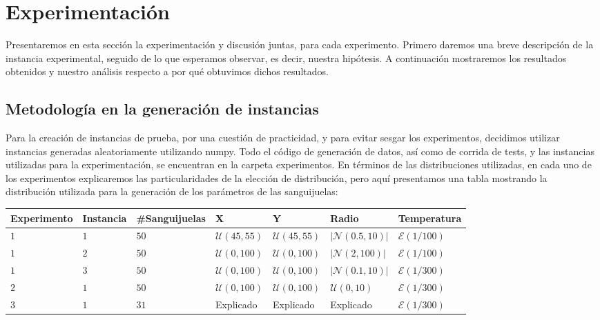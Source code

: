 \section{Experimentación}

Presentaremos en esta sección la experimentación y discusión juntas, para cada experimento. Primero daremos una breve descripción de la instancia experimental, seguido de lo que esperamos observar, es decir, nuestra hipótesis. A continuación mostraremos los 
resultados obtenidos y nuestro análisis respecto a por qué obtuvimos dichos resultados.

\subsection{Metodología en la generación de instancias}

Para la creación de instancias de prueba, por una cuestión de practicidad, y para evitar sesgar los experimentos, decidimos utilizar instancias generadas aleatoriamente utilizando numpy. Todo el código de generación de datos, así como de corrida de tests, y las instancias utilizadas para la experimentación, se encuentran en la carpeta experimentos. En términos de las distribuciones utilizadas, en cada uno de los experimentos explicaremos las particularidades de la elección de distribución, pero aquí presentamos una tabla mostrando la distribución utilizada para la generación de los parámetros de las sanguijuelas:

\begin{center}
\begin{tabular}{l | l | l | l | l | l | l}
Experimento & Instancia & \#Sanguijuelas & X & Y & Radio & Temperatura\\ \hline
$1$ & $1$ & $50$ & $\mathcal{U}(45, 55)$ & $\mathcal{U}(45, 55)$ & $|\mathcal{N}(0.5, 10)|$ & $\mathcal{E}(1/100)$\\ \hline
$1$ & $2$ & $50$ & $\mathcal{U}(0, 100)$ & $\mathcal{U}(0, 100)$ & $|\mathcal{N}(2, 100)|$ & $\mathcal{E}(1/100)$\\ \hline
$1$ & $3$ & $50$ & $\mathcal{U}(0, 100)$ & $\mathcal{U}(0, 100)$ & $|\mathcal{N}(0.1, 10)|$ & $\mathcal{E}(1/300)$\\ \hline
$2$ & $1$ & $50$ & $\mathcal{U}(0, 100)$ & $\mathcal{U}(0, 100)$ & $\mathcal{U}(0, 10)$ & $\mathcal{E}(1/300)$\\ \hline
$3$ & $1$ & $31$ & Explicado & Explicado & Explicado & $\mathcal{E}(1/300)$\\ \hline
\end{tabular}
\end{center}

